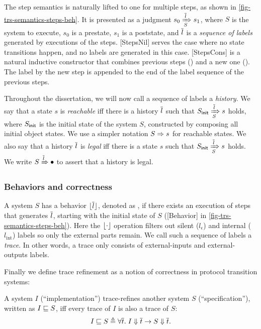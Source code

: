 The step semantics is naturally lifted to one for multiple steps, as shown in \autoref{fig-trs-semantics-steps-beh}.
It is presented as a judgment $\semsteps{S}{s_0}{\listof{l}}{s_1}$, where $S$ is the system to execute, $s_0$ is a prestate, $s_1$ is a poststate, and $\listof{l}$ is a \emph{sequence of labels} generated by executions of the steps.
[StepsNil] serves the case where no state transitions happen, and no labels are generated in this case.
[StepsCons] is a natural inductive constructor that combines previous steps () and a new one ().
The label by the new step is appended to the end of the label sequence of the previous steps.

Throughout the dissertation, we will now call a sequence of labels a \emph{history}.
We say that a state $s$ is \emph{reachable} iff there is a history $\listof{l}$ such that $\semsteps{S}{\sysInit{S}}{\listof{l}}{s}$ holds, where $\sysInit{S}$ is the initial state of the system $S$, constructed by composing all initial object states.
We use a simpler notation $\semrch{S}{s}$ for reachable states.
We also say that a history $\listof{l}$ is \emph{legal} iff there is a state $s$ such that $\semsteps{S}{\sysInit{S}}{\listof{l}}{s}$ holds.
We write $\semleg{S}{\listof{l}}$ to assert that a history is legal.

\subsubsection{Behaviors and correctness}

A system $S$ has a behavior $\behOf{\listof{l}}$, denoted as , if there exists an execution of steps that generates $\listof{l}$, starting with the initial state of $S$ ([Behavior] in \autoref{fig-trs-semantics-steps-beh}).
Here the $\behOf{\cdot}$ operation filters out silent ($l_\epsilon$) and internal ($l_{\textrm{int}}$) labels so only the external parts remain.
We call such a sequence of labels a \emph{trace}.
In other words, a trace only consists of external-inputs and external-outputs labels.

Finally we define trace refinement as a notion of correctness in protocol transition systems:
\begin{definition}
  A system $I$ (``implementation'') trace-refines another system $S$ (``specification''), written as $\refines{I}{S}$, iff every trace of $I$ is also a trace of $S$:
  \begin{displaymath}
    \refines{I}{S} \triangleq \forall \listof{t}.\; \sembeh{I}{\listof{t}} \to \sembeh{S}{\listof{t}}.
  \end{displaymath}
\end{definition}

